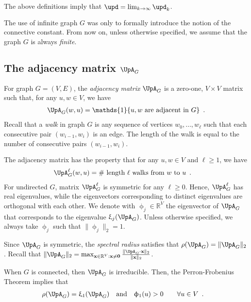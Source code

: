 \documentclass[11pt,reqno]{amsart}
\numberwithin{equation}{section}
\newcommand{\applegreen}[1]{ {\color{applegreen}#1}}
\newcommand{\blue}[1]{{\color{blue}#1}}
\newcommand{\bluepigment}[1]{{\color{blue(pigment)}#1}}
\newcommand{\capri}[1]{{\color{capri}#1}}
\newcommand{\coquelicot}[1]{{\color{coquelicot}#1}}
\newcommand{\goldenbrown}[1]{{\color{goldenbrown}#1}}
\newcommand{\red}[1]{{\color{red}#1}}
\newcommand{\Ind}{\mathds{1}}
\newcommand{\cconnective}{\goldenbrown{\upd}}
\newcommand{\spradius}{{\rho}}
\newcommand{\eigenval}{\upxi}
\newcommand{\norm}[2]{\goldenbrown{\|} #1 \goldenbrown{\|}_{#2}}
\newcommand{\Adjacency}{{\UpA}}
\newcommand{\maxeigenv}{\upphi_1}
\newcommand{\eigenv}{\upphi}
\renewcommand{\applegreen}[1]{#1}
\renewcommand{\blue}[1]{#1}
\renewcommand{\bluepigment}[1]{#1}
\renewcommand{\capri}[1]{#1}
\renewcommand{\coquelicot}[1]{#1}
\renewcommand{\goldenbrown}[1]{#1}
\renewcommand{\red}[1]{#1}
\newcommand{\ki}{\capri{i}}
\newcommand{\kj}{\coquelicot{j}}
\newcommand{\kk}{\bluepigment{k}}
\newcommand{\kell}{{\color{green(pigment)}\ell}}%
\newcommand{\ku}{\red{u}}
\newcommand{\kw}{\blue{w}}
\renewcommand{\ki}{i}
\renewcommand{\kj}{j}
\renewcommand{\kk}{k}
\renewcommand{\kell}{\ell}
\renewcommand{\ku}{u}
\renewcommand{\kw}{w}
\begin{document}
The above definitions imply that $\cconnective=\lim_{\kk \to\infty} \cconnective_{\kk}$. 

The use of infinite graph $G$ was only to formally introduce  the notion of the connective constant. 
From now on,  unless otherwise specified,  we assume that the graph $G$ is always {\em finite}.


\subsection{The adjacency matrix $\Adjacency_G$}
For graph $G=(V,E)$, the {\em adjacency matrix} $\Adjacency_G$ is a zero-one, $V\times V$ matrix 
such that, for any $\ku,\kw\in V$, we have
\begin{align}\nonumber 
\Adjacency_G(\kw,\ku)= \Ind\{\textrm{$\ku, \kw$ are adjacent in $G$}\} \enspace.
\end{align}
%
Recall that a {\em walk} in  graph $G$ is any sequence of vertices $\kw_0, \ldots, \kw_{\kell}$ 
such that each consecutive pair $(\kw_{\ki-1}, \kw_{\ki})$ is an edge.
%
The length of the walk is equal to the number of consecutive pairs $(\kw_{\ki-1}, \kw_{\ki})$.

The adjacency matrix has the property that for any $\ku,\kw\in V$ and $\kell\geq 1$,
we have 
\begin{align}\label{eq:NoOfWalksVSA2L}
  \Adjacency^{\kell}_G (\kw,\ku)&=\textrm{$\#$ length $\kell$ walks\ from}\ \kw\ \textrm{to}\ \ku \enspace.
\end{align}
For undirected $G$, matrix $\Adjacency^{\kell}_G$ is symmetric for any $\kell\geq 0$. Hence, $\Adjacency^{\kell}_G$ has real eigenvalues, while 
the eigenvectors corresponding to distinct eigenvalues are orthogonal with each other. 
We denote with $\eigenv_{\kj} \in \mathbb{R}^V$ the eigenvector of $\Adjacency_G$ 
that corresponds to the eigenvalue $\eigenval_{\kj}(\Adjacency_G)$.
Unless otherwise specified, we always take $\eigenv_{\kj}$ such that $ \norm{ \eigenv_{\kj}}{2}=1$.



Since $\Adjacency_G$ is symmetric, the {\em spectral radius} satisfies that $\spradius(\Adjacency_G)=\norm{\Adjacency_G}{2}$. 
Recall that $\norm{\Adjacency_G}{2}=\max_{{\bf x}\in\mathbb{R}^V:{\bf x}\neq {\bf 0}}\frac{ \norm{ \Adjacency_G \cdot {\bf x}}{2}}{\norm{ {\bf x}}{2}}$.



When $G$ is connected, then $\Adjacency_G$ is irreducible. Then, the Perron-Frobenius Theorem 
implies that
%
\begin{align}\label{eq:DefOfBSMatrix}
\spradius(\Adjacency_G)&=\eigenval_1(\Adjacency_G)& \textrm{and} && \maxeigenv(\ku) &>0 \qquad \forall \ku\in V \enspace.
\end{align}
%
 
\end{document}

